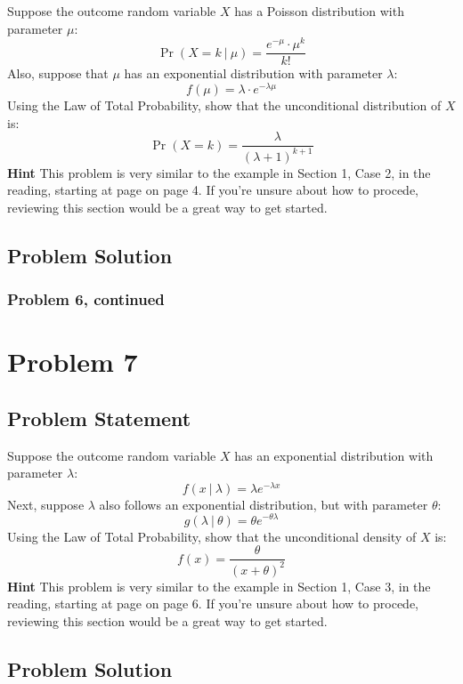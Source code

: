 \documentclass[12pt]{article}
\theoremstyle{definition}
\begin{document}
Suppose the outcome random variable $X$ has a Poisson distribution with parameter $\mu$:
$$
\Pr(X = k\ |\ \mu) = \frac{ e^{-\mu} \cdot \mu^k}{k!}
$$
Also, suppose that $\mu$ has an exponential distribution with parameter $\lambda$:
$$
f(\mu) = \lambda \cdot e^{-\lambda \mu}
$$
Using the Law of Total Probability, show that the unconditional distribution of $X$ is:
$$
\Pr( X = k ) = \frac{ \lambda }{(\lambda + 1)^{k+1}}
$$
{\bf Hint} This problem is very similar to the example in Section 1, Case 2, in the reading, starting at page on page 4. If you're unsure about how to procede, reviewing this section would be a great way to get started.


\subsection*{Problem Solution}


\newpage
\subsubsection*{Problem 6, continued}



\newpage
\section*{Problem 7}

\subsection*{Problem Statement}

Suppose the outcome random variable $X$ has an exponential distribution with parameter $\lambda$:
$$
f(x\ |\ \lambda) = \lambda  e^{-\lambda x}
$$
Next, suppose $\lambda$ also follows an exponential distribution, but with parameter $\theta$:
$$
g(\lambda\ |\ \theta) = \theta e^{-\theta \lambda}
$$
Using the Law of Total Probability, show that the unconditional density of $X$ is:
$$
f(x) = \frac{ \theta }{(x + \theta)^2}
$$
{\bf Hint} This problem is very similar to the example in Section 1, Case 3, in the reading, starting at page on page 6. If you're unsure about how to procede, reviewing this section would be a great way to get started.

\subsection*{Problem Solution}


\newpage
\end{document}
